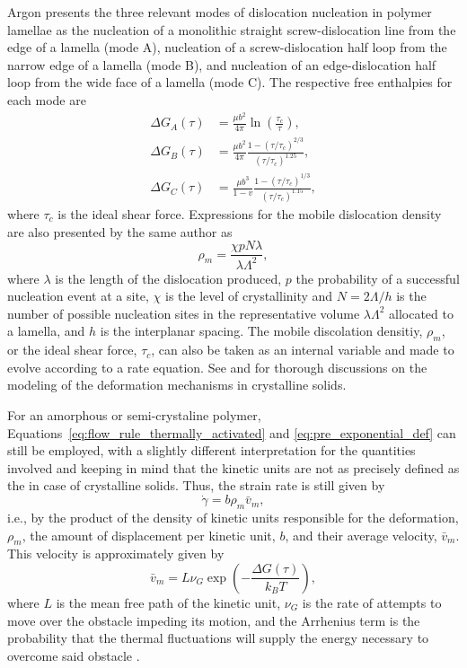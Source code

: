 Argon \citep{argonPhysicsDeformationFracture2013a} presents the three relevant modes of dislocation nucleation in polymer lamellae as the nucleation of a monolithic straight screw-dislocation line from the edge of a lamella (mode A), nucleation of a screw-dislocation half loop from the narrow edge of a lamella (mode B), and nucleation of an edge-dislocation half loop from the wide face of a lamella (mode C).
The respective free enthalpies for each mode are
\begin{align}
	\Delta G_A(\tau)&=\frac{\mu b^2}{4 \pi} \ln\left(\frac{\tau_c}{\tau}\right),\\
	\Delta G_B(\tau)&=\frac{\mu b^2}{4 \pi} \frac{1-(\tau/\tau_c)^{2 / 3}}{(\tau/\tau_c)^{1.25} },\\
	\Delta G_C(\tau)&=\frac{\mu b^3}{1-v} \frac{1-(\tau/\tau_c)^{1 / 3}}{(\tau/\tau_c)^{1.15} },
\end{align}
where $\tau_c$ is the ideal shear force.
Expressions for the mobile dislocation density are also presented by the same author as
\begin{equation}
	\rho_m = \frac{\chi p N \lambda}{\lambda \Lambda^2},
\end{equation}
where $\lambda$ is the length of the dislocation produced, $p$ the probability of a successful nucleation event at a site, $\chi$ is the level of crystallinity and $N = 2\Lambda/h$ is the number of possible nucleation sites in the representative volume $\lambda \Lambda^2$ allocated to a lamella, and $h$ is the interplanar spacing.
The mobile discolation densitiy, $\rho_m$, or the ideal shear force, $\tau_c$, can also be taken as an internal variable and made to evolve according to a rate equation.
See \cite{klahn1970strain} and \cite{kocks1975thermodynamics} for thorough discussions on the modeling of the deformation mechanisms in crystalline solids.

For an amorphous or semi-crystaline polymer,  Equations~\eqref{eq:flow_rule_thermally_activated} and \eqref{eq:pre_exponential_def} can still be employed, with a slightly different interpretation for the quantities involved and keeping in mind that the kinetic units are not as precisely defined as the in case of crystalline solids.
Thus, the strain rate is still given by
\begin{equation}
  \label{eq:plaston_formula}
  \dot \gamma = b \rho_m \bar{v}_m,
\end{equation}
i.e., by the product of the density of kinetic units responsible for the deformation, $\rho_m$, the amount of displacement per kinetic unit, $b$, and their average velocity, $\bar v_m$.
This velocity is approximately given by
\begin{equation}
  \bar v_m = L \nu_G \exp\left(-\frac{\Delta G(\tau)}{k_B T}\right),
\end{equation}
where $L$ is the mean free path of the kinetic unit, $\nu_G$ is the rate of attempts to move over the obstacle impeding its motion, and the Arrhenius term is the probability that the thermal fluctuations will supply the energy necessary to overcome said obstacle \citep{gsellYieldTransientEffects1981, gilmanPLASTICWAVEMYTH1992}.

